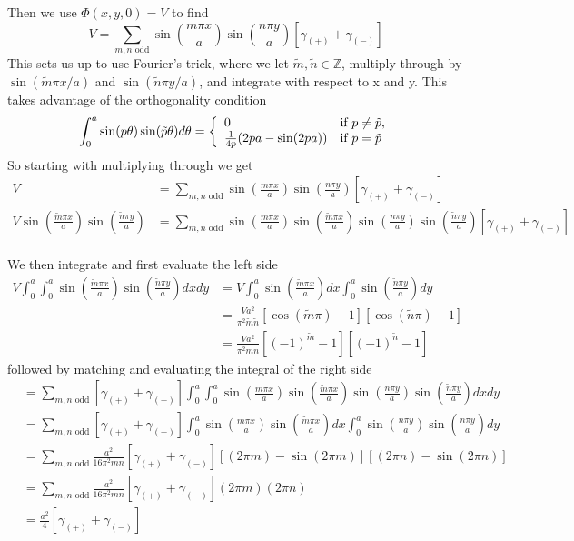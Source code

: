 \documentclass{article}
\begin{document}
Then we use $\Phi(x,y,0)=V$ to find
\[ V = \sum_{m,n \text{ odd}}\sin\left(\frac{ m\pi x }{ a }\right) \sin\left(\frac{ n\pi y }{ a }\right) \left[ \gamma_{(+)}+\gamma_{(-)} \right] \]
This sets us up to use Fourier's trick, where we let $\tilde{m},\tilde{n}\in\mathbb{Z}$, multiply through by $\sin( \tilde{m}\pi x / a )$ and $\sin( \tilde{n}\pi y / a )$, and integrate with respect to x and y. This takes advantage of the orthogonality condition
\[ \int_{0}^{a}\sin(p\theta)\sin(\tilde{p}\theta)d\theta = \left\{
\begin{array}{l l}
0 & \mbox{if } p\ne\tilde{p},\\
\frac{1}{4p}( 2pa - \sin(2pa) )  & \mbox{if } p=\tilde{p}
\end{array} \right. \]
So starting with multiplying through we get
\begin{align*}
V &= \sum_{m,n \text{ odd}} \sin\left(\frac{ m\pi x }{ a }\right) \sin\left(\frac{ n\pi y }{ a }\right) \left[ \gamma_{(+)}+\gamma_{(-)} \right]\\
V \sin\left( \frac{ \tilde{m}\pi x }{ a } \right) \sin\left( \frac{ \tilde{n}\pi y }{ a } \right) &= \sum_{m,n \text{ odd}} \sin\left(\frac{ m\pi x }{ a } \right) \sin\left( \frac{ \tilde{m}\pi x }{ a } \right) \sin\left(\frac{ n\pi y }{ a }\right) \sin\left( \frac{ \tilde{n}\pi y }{ a } \right) \left[ \gamma_{(+)}+\gamma_{(-)} \right]
\end{align*}
\\
We then integrate and first evaluate the left side
\begin{align*}
V \int_{0}^{a}\int_{0}^{a} \sin\left( \frac{ \tilde{m}\pi x }{ a } \right) \sin\left( \frac{ \tilde{n}\pi y }{ a } \right) dxdy &= V \int_{0}^{a} \sin\left( \frac{ \tilde{m}\pi x }{ a } \right) dx \int_{0}^{a} \sin\left( \frac{ \tilde{n}\pi y }{ a } \right) dy\\
&= \frac{Va^{2}}{\pi^{2}\tilde{m}\tilde{n}} [ \cos(\tilde{m}\pi) - 1 ] [ \cos(\tilde{n}\pi) - 1 ]\\
&= \frac{Va^{2}}{\pi^{2}\tilde{m}\tilde{n}} [ (-1)^{\tilde{m}} - 1 ] [ (-1)^{\tilde{n}} - 1 ]
\end{align*}
followed by matching and evaluating the integral of the right side
\begin{align*}
&= \sum_{m,n \text{ odd}} \left[ \gamma_{(+)}+\gamma_{(-)} \right] \int_{0}^{a}\int_{0}^{a} \sin\left(\frac{ m\pi x }{ a } \right) \sin\left( \frac{ \tilde{m}\pi x }{ a } \right) \sin\left(\frac{ n\pi y }{ a }\right) \sin\left( \frac{ \tilde{n}\pi y }{ a } \right) dxdy\\
&= \sum_{m,n \text{ odd}} \left[ \gamma_{(+)}+\gamma_{(-)} \right] \int_{0}^{a} \sin\left(\frac{ m\pi x }{ a } \right) \sin\left( \frac{ \tilde{m}\pi x }{ a } \right) dx \int_{0}^{a} \sin\left(\frac{ n\pi y }{ a }\right) \sin\left( \frac{ \tilde{n}\pi y }{ a } \right) dy\\
&= \sum_{m,n \text{ odd}} \frac{a^{2}}{16\pi^{2}mn}\left[ \gamma_{(+)}+\gamma_{(-)} \right] [ (2\pi m) - \sin(2\pi m) ][ (2\pi n) - \sin(2\pi n) ]\\
&= \sum_{m,n \text{ odd}} \frac{a^{2}}{16\pi^{2}mn}\left[ \gamma_{(+)}+\gamma_{(-)} \right] (2\pi m) (2\pi n)\\
&= \frac{a^{2}}{4}\left[ \gamma_{(+)}+\gamma_{(-)} \right]
\end{align*}
\end{document}
